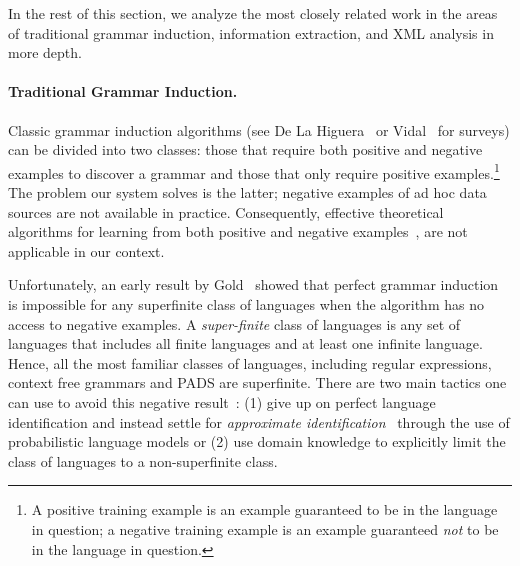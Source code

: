 \noindent
In the rest of this section, we analyze
the most closely related work in the areas of
traditional grammar induction, information extraction, and XML analysis
in more depth.

\paragraph*{Traditional Grammar Induction.}
Classic grammar induction algorithms (see De La
Higuera~\cite{higuera01current} or Vidal~\cite{vidal:gisurvey} for
surveys) can be divided into two classes: those that require both
positive and negative examples to discover a grammar and those that
only require positive examples.\footnote{A positive training example
is an example guaranteed to be in the language in question; a negative
training example is an example guaranteed {\em not} to be in the
language in question.}  The problem our system solves is the latter;
negative examples of ad hoc data sources are not available in
practice.  Consequently, effective theoretical algorithms for learning
from both positive and negative
examples~\cite{rpni,denis:learning-regular-languages,lemay+:tree-transducers,raeymaekers+:learning-tree-languages},
are not applicable in our context.

Unfortunately, an early result by Gold~\cite{gold:inference} showed
that perfect grammar induction is impossible for any superfinite class
of languages when the algorithm has no access to negative examples.  A
{\em super-finite} class of languages is any set of languages that
includes all finite languages and at least one infinite
language. Hence, all the most familiar classes of languages, including
regular expressions, context free grammars and PADS are superfinite.
There are two main tactics one can use to avoid this negative
result~\cite{vidal:gisurvey}: 
(1) give up on perfect language identification and instead settle for {\em approximate
identification}~\cite{wharton:approximate-language-identification}
through the use of probabilistic language models or 
(2) use domain knowledge to explicitly limit the class of languages to a
non-superfinite class.

